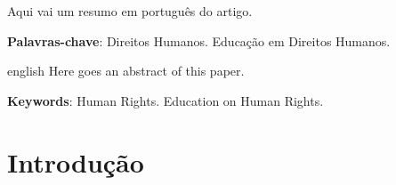 \documentclass[
	article,			%
	11pt,				%
	oneside,			%
	a4paper,			%
	english,			%
	brazil,				%
	sumario=tradicional
]{abntex2}
\begin{document}

\frenchspacing


%
%

\maketitle



\begin{resumoumacoluna}
 Aqui vai um resumo em português do artigo.

 \vspace{\onelineskip}
 
 \noindent
 \textbf{Palavras-chave}: Direitos Humanos. Educação em Direitos Humanos.
\end{resumoumacoluna}


\renewcommand{\resumoname}{Abstract}
\begin{resumoumacoluna}
 \begin{otherlanguage*}{english}
   Here goes an abstract of this paper.

   \vspace{\onelineskip}
 
   \noindent
   \textbf{Keywords}: Human Rights. Education on Human Rights.
 \end{otherlanguage*}  
\end{resumoumacoluna}


\textual

\section{Introdução}
\end{document}
